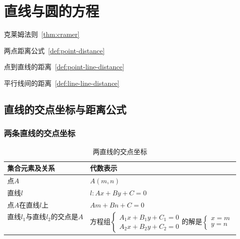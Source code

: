 \chapter{直线与圆的方程}
\label{ch:直线与圆的方程}

\begin{introduction}
  \item 克莱姆法则~\ref{thm:cramer}
  \item 两点距离公式~\ref{def:point-distance}
  \item 点到直线的距离~\ref{def:point-line-distance}
  \item 平行线间的距离~\ref{def:line-line-distance}
\end{introduction}


\section{直线的交点坐标与距离公式}

\subsection{两条直线的交点坐标}

\begin{table}[htbp]
  \caption{两直线的交点坐标\label{tab:color thm}}
  \centering
  \begin{tabular}{ll}
  \toprule
              集合元素及关系
              & 代数表示\\
  \midrule
              点$A$
              & $A(m, n)$ \\
              直线$l$
              & $l: Ax+By+C=0$ \\
              点$A$在直线$l$上
              & $Am+Bn+C=0$\\
              直线$l_1$与直线$l_2$的交点是$A$
              &\parbox{8cm}{\begin{equation*}\mbox{方程组} \left \{ \begin{array}{l} A_{1}x+B_{1}y+C_{1} = 0\\ A_{2}x+B_{2}y+C_{2} = 0 \end{array} \mbox{的解是} \left \{ \begin{array}{l} x = m\\ y = n  \end{array} \right . \end{equation*}}\\
  \bottomrule
  \end{tabular}
\end{table}


